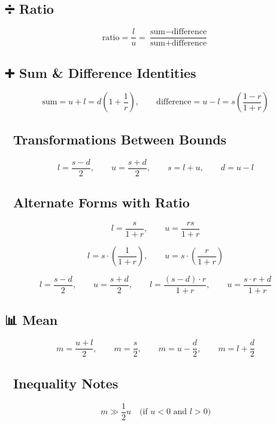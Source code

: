 \documentclass[
  letterpaper,
]{book}
\begin{document}
\subsection{➗ Ratio}\label{ratio}

\[
\text{ratio} = \frac{l}{u} = \frac{\text{sum} - \text{difference}}{\text{sum} + \text{difference}}
\]

\subsection{➕ Sum \& Difference
Identities}\label{sum-difference-identities}

\[
\text{sum} = u + l = d\left(1 + \frac{1}{r}\right), \qquad
\text{difference} = u - l = s\left(\frac{1 - r}{1 + r}\right)
\]

\subsection{🔀 Transformations Between
Bounds}\label{transformations-between-bounds}

\[
l = \frac{s - d}{2}, \qquad
u = \frac{s + d}{2}, \qquad
s = l + u, \qquad
d = u - l
\]

\subsection{🔁 Alternate Forms with
Ratio}\label{alternate-forms-with-ratio}

\[
l = \frac{s}{1 + r}, \qquad
u = \frac{rs}{1 + r}
\]

\[
l = s \cdot \left(\frac{1}{1 + r}\right), \qquad
u = s \cdot \left(\frac{r}{1 + r}\right)
\]

\[
l = \frac{s - d}{2}, \qquad
u = \frac{s + d}{2}, \qquad
l = \frac{(s - d) \cdot r}{1 + r}, \qquad
u = \frac{s \cdot r + d}{1 + r}
\]

\subsection{📊 Mean}\label{mean}

\[
m = \frac{u + l}{2}, \qquad
m = \frac{s}{2}, \qquad
m = u - \frac{d}{2}, \qquad
m = l + \frac{d}{2}
\]

\subsection{🧮 Inequality Notes}\label{inequality-notes}

\[
m \gg \frac{1}{2} u \quad \text{(if } u < 0 \text{ and } l > 0\text{)}
\]
\end{document}
